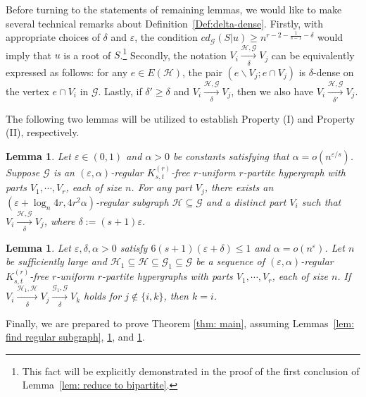 \documentclass[11pt]{article}
\newtheorem{lem}[dfn]{Lemma}
\begin{document}
Before turning to the statements of remaining lemmas, we would like to make several technical remarks about Definition~\ref{Def:delta-dense}.
Firstly, with appropriate choices of $\delta$ and $\varepsilon$, the condition $cd_{\mathcal G}(S|u)\ge n^{r-2-\frac{1}{s-1}-\delta}$ would imply that $u$ is a root of $S$.\footnote{This fact will be explicitly demonstrated in the proof of the first conclusion of Lemma~\ref{lem: reduce to bipartite}.}
Secondly, the notation $V_i \xrightarrow[\delta]{\mathcal H, \mathcal G} V_j$ can be equivalently expressed as follows: for any $e\in E(\mathcal H)$, the pair $(e\backslash V_j; e\cap V_j)$ is $\delta$-dense on the vertex $e\cap V_i$ in $\mathcal G$.
Lastly, if $\delta'\geq \delta$ and $V_i \xrightarrow[\delta]{\mathcal H, \mathcal G} V_j$, then we also have $V_i \xrightarrow[\delta']{\mathcal H, \mathcal G} V_j$.

\medskip

The following two lemmas will be utilized to establish Property (I) and Property (II), respectively.

\begin{lem}\label{lem: dense subgraph}
Let $\varepsilon\in (0,1)$ and $\alpha> 0$ be constants satisfying that  $\alpha=o\left(n^{\varepsilon/s}\right)$.
Suppose $\mathcal G$ is an  $(\varepsilon,\alpha)$-regular $K_{s,t}^{(r)}$-free $r$-uniform $r$-partite  hypergraph with parts $V_1,\cdots , V_{r }$, each of size $n$. For any part $V_j$,
there exists an $(\varepsilon+\log_n 4r,4r^2\alpha)$-regular subgraph $\mathcal H\subseteq \mathcal G$ and a distinct part $V_i$ such that
$V_i \xrightarrow[\delta]{\mathcal  H, \mathcal G } V_j$, where $\delta:=(s+1)\varepsilon$.
\end{lem}

\begin{lem}\label{lem: 1root2root3}
Let $\varepsilon, \delta, \alpha>0$ satisfy $6(s+1)(\varepsilon + \delta)\le 1$ and $\alpha=o\left(n^{\varepsilon}\right)$.
Let $n$ be sufficiently large and $\mathcal H_1\subseteq\mathcal H\subseteq \mathcal G_1 \subseteq\mathcal G$ be a sequence of $(\varepsilon, \alpha) $-regular $K_{s,t}^{(r)}$-free $r$-uniform $r$-partite hypergraphs  with parts $V_1,\cdots , V_{r }$, each of size $n$. If
$V_i \xrightarrow[\delta]{\mathcal  H_1, \mathcal H}  V_j \xrightarrow[\delta]{\mathcal  G_1,\mathcal G }  V_k$ holds for $j\notin \{i,k\}$,
then $k=i$.
\end{lem}


Finally, we are prepared to prove Theorem \ref{thm: main}, assuming Lemmas~\ref{lem: find regular subgraph}, \ref{lem: dense subgraph}, and \ref{lem: 1root2root3}.
\end{document}
